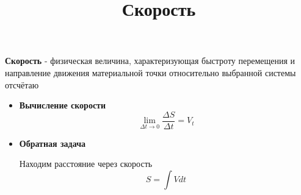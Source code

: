 \documentclass[12pt]{article}
\title{Скорость}
\begin{document}
  
  \maketitle  
{\bf Скорость} - физическая величина, характеризующая быстроту перемещения и направление
движения материальной точки относительно выбранной системы отсчётаю
\begin{itemize}
\item {\bf Вычисление скорости}
\[
   \lim_{\Delta{t} \to 0}\frac{\Delta{S}}{\Delta{t}}=V_{t}
\]
\item {\bf Обратная задача}

Находим расстояние через скорость
\[S=\int{Vdt}\]
\end{itemize}
\end{document}

